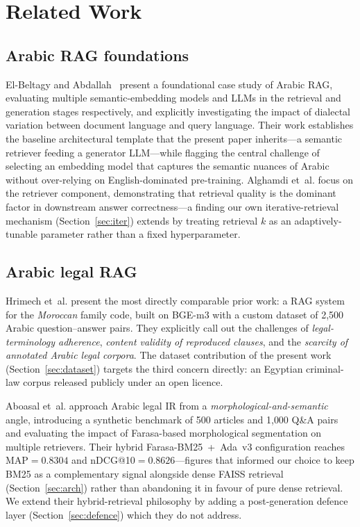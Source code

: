 \documentclass[final,1p,times]{elsarticle}
\begin{document}
\section{Related Work}\label{sec:related}

\subsection{Arabic RAG foundations}

El-Beltagy and Abdallah~\cite{elbeltagy2024} present a foundational case
study of Arabic RAG, evaluating multiple semantic-embedding models and LLMs
in the retrieval and generation stages respectively, and explicitly
investigating the impact of dialectal variation between document language and
query language. Their work establishes the baseline architectural template
that the present paper inherits---a semantic retriever feeding a generator
LLM---while flagging the central challenge of selecting an embedding model
that captures the semantic nuances of Arabic without over-relying on
English-dominated pre-training. Alghamdi et~al.\cite{alghamdi2023} focus on
the retriever component, demonstrating that retrieval quality is the
dominant factor in downstream answer correctness---a finding our own
iterative-retrieval mechanism (Section~\ref{sec:iter}) extends by treating
retrieval $k$ as an adaptively-tunable parameter rather than a fixed
hyperparameter.

\subsection{Arabic legal RAG}

Hrimech et~al.\cite{hrimech2025} present the most directly comparable prior
work: a RAG system for the \emph{Moroccan} family code, built on BGE-m3 with
a custom dataset of 2{,}500 Arabic question--answer pairs. They explicitly
call out the challenges of \emph{legal-terminology adherence}, \emph{content
validity of reproduced clauses}, and the \emph{scarcity of annotated Arabic
legal corpora}. The dataset contribution of the present work
(Section~\ref{sec:dataset}) targets the third concern directly: an Egyptian
criminal-law corpus released publicly under an open licence.

Aboasal et~al.\cite{aboasal2025} approach Arabic legal IR from a
\emph{morphological-and-semantic} angle, introducing a synthetic benchmark of
500 articles and 1{,}000 Q\&A pairs and evaluating the impact of Farasa-based
morphological segmentation on multiple retrievers. Their hybrid
Farasa-BM25~+~Ada~v3 configuration reaches MAP$=0.8304$ and
nDCG@10$=0.8626$---figures that informed our choice to keep BM25 as a
complementary signal alongside dense FAISS retrieval
(Section~\ref{sec:arch}) rather than abandoning it in favour of pure dense
retrieval. We extend their hybrid-retrieval philosophy by adding a
post-generation defence layer (Section~\ref{sec:defence}) which they do
not address.
\end{document}
